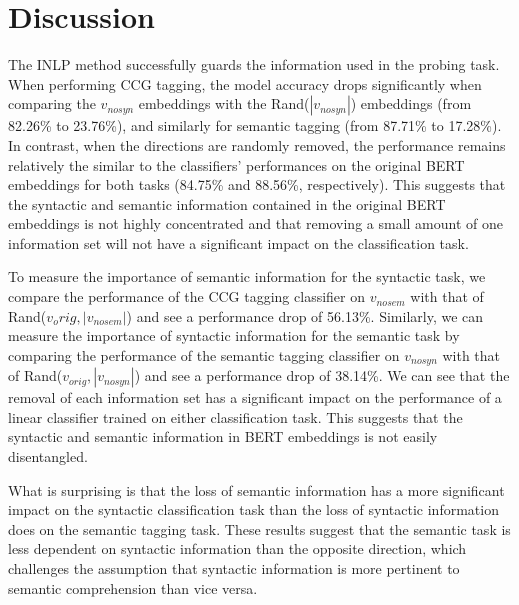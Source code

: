 \documentclass[11pt,a4paper]{article}
\begin{document}
\section{Discussion}
\label{sec:discussion}
The INLP method successfully guards the information used in the probing task. When performing CCG tagging, the model accuracy drops significantly when comparing the $v_{nosyn}$ embeddings with the Rand($|v_{nosyn}|$) embeddings (from 82.26\% to 23.76\%), and similarly for semantic tagging (from 87.71\% to 17.28\%). In contrast, when the directions are randomly removed, the performance remains relatively the similar to the classifiers' performances on the original BERT embeddings for both tasks (84.75\% and 88.56\%, respectively). This suggests that the syntactic and semantic information contained in the original BERT embeddings is not highly concentrated and that removing a small amount of one information set will not have a significant impact on the classification task. 


To measure the importance of semantic information for the syntactic task, we compare the performance of the CCG tagging classifier on $v_{nosem}$ with that of Rand($v_orig, |v_{nosem}|$) and see a performance drop of 56.13\%. Similarly, we can measure the importance of syntactic information for the semantic task by comparing the performance of the semantic tagging classifier on $v_{nosyn}$ with that of Rand($v_{orig}, |v_{nosyn}|$) and see a performance drop of 38.14\%. We can see that the removal of each information set has a significant impact on the performance of a linear classifier trained on either classification task. This suggests that the syntactic and semantic information in BERT embeddings is not easily disentangled.

What is surprising is that the loss of semantic information has a more significant impact on the syntactic classification task than the loss of syntactic information does on the semantic tagging task. These results suggest that the semantic task is less dependent on syntactic information than the opposite direction, which challenges the assumption that syntactic information is more pertinent to semantic comprehension than vice versa. 
\end{document}
